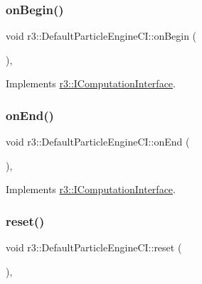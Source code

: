 \subsubsection{\texorpdfstring{on\+Begin()}{onBegin()}}
{\footnotesize\ttfamily void r3\+::\+Default\+Particle\+Engine\+C\+I\+::on\+Begin (\begin{DoxyParamCaption}{ }\end{DoxyParamCaption})\hspace{0.3cm}{\ttfamily [override]}, {\ttfamily [virtual]}}



Implements \mbox{\hyperlink{classr3_1_1_i_computation_interface_a430ebc9cb8d4ba064ac6a032ef07edd7}{r3\+::\+I\+Computation\+Interface}}.

\mbox{\label{classr3_1_1_default_particle_engine_c_i_a6a34c77436d8133560eaa7366c740119}} 
\subsubsection{\texorpdfstring{on\+End()}{onEnd()}}
{\footnotesize\ttfamily void r3\+::\+Default\+Particle\+Engine\+C\+I\+::on\+End (\begin{DoxyParamCaption}{ }\end{DoxyParamCaption})\hspace{0.3cm}{\ttfamily [override]}, {\ttfamily [virtual]}}



Implements \mbox{\hyperlink{classr3_1_1_i_computation_interface_acae0c5fada7e414c74fe6f5a8f4a6c7d}{r3\+::\+I\+Computation\+Interface}}.

\mbox{\label{classr3_1_1_default_particle_engine_c_i_a97757c62b4cb1266da29e2b5625bb9d3}} 
\subsubsection{\texorpdfstring{reset()}{reset()}}
{\footnotesize\ttfamily void r3\+::\+Default\+Particle\+Engine\+C\+I\+::reset (\begin{DoxyParamCaption}{ }\end{DoxyParamCaption})\hspace{0.3cm}{\ttfamily [override]}, {\ttfamily [virtual]}}



